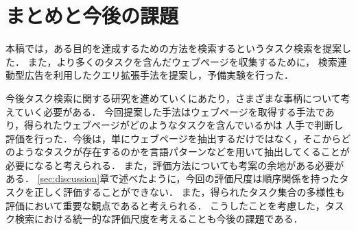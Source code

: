 \documentclass[submit,techreq]{ipsj}
\begin{document}
\begin{table}[t] 
\caption{クエリ拡張により新しく得られた行動のsubtype-of関係による分類結果．} 
\label{tbl:subtype}
\begin{center}
\end{center}
\vspace{-1.0em}
\end{table}





\section{まとめと今後の課題}
本稿では，ある目的を達成するための方法を検索するというタスク検索を提案した．
また，より多くのタスクを含んだウェブページを収集するために，
検索連動型広告を利用したクエリ拡張手法を提案し，予備実験を行った．

今後タスク検索に関する研究を進めていくにあたり，さまざまな事柄について考えていく必要がある．
今回提案した手法はウェブページを取得する手法であり，得られたウェブページがどのようなタスクを含んでいるかは
人手で判断し評価を行った．今後は，単にウェブページを抽出するだけではなく，そこからどのようなタスクが存在するのかを言語パターンなどを用いて抽出してくることが必要になると考えられる．
また，評価方法についても考案の余地がある必要がある．
\ref{sec:discussion}章で述べたように，今回の評価尺度は順序関係を持ったタスクを正しく評価することができない．
また，得られたタスク集合の多様性も評価において重要な観点であると考えられる．
こうしたことを考慮した，タスク検索における統一的な評価尺度を考えることも今後の課題である．
\end{document}

